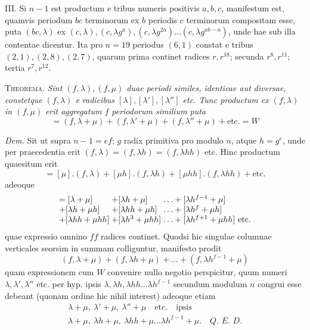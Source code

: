 III. Si \(n-1\) est productum e tribus numeris positivis \(a,\allowbreak b,\allowbreak c\), manifestum est, quamvis periodum \(bc\) terminorum ex \(b\) periodis \(c\) terminorum compositam esse, puta \((bc,\allowbreak \lambda)\) ex \((c,\allowbreak \lambda),\allowbreak (c,\allowbreak \lambda g^a),\allowbreak (c,\allowbreak \lambda g^{2a})\ldots(c,\allowbreak \lambda g^{ab-a})\), unde hae sub illa contentae dicentur. Ita pro \(n=19\) periodus \((6,\allowbreak 1)\) constat e tribus \((2,\allowbreak 1),\allowbreak (2,\allowbreak 8),\allowbreak (2,\allowbreak 7)\), quarum prima continet radices \(r,\allowbreak r^{18}\); secunda \(r^8,\allowbreak r^{11}\); tertia \(r^7,\allowbreak r^{12}\).

\textsc{Theorema.} \textit{Sint \((f,\allowbreak \lambda),\allowbreak (f,\allowbreak \mu)\) duae periodi similes, identicae aut diversae,} \textit{constetque \((f,\allowbreak \lambda)\) e radicibus \([\lambda],\allowbreak [\lambda'],\allowbreak [\lambda'']\) etc. Tunc productum ex \((f,\allowbreak \lambda)\) in \((f,\allowbreak \mu)\)} \textit{erit aggregatum \(f\) periodorum similium puta} \[=(f,\lambda+\mu)+(f,\lambda'+\mu)+(f,\lambda''+\mu)+\mathrm{etc.}=W\]

\textit{Dem.} Sit ut supra \(n-1=ef\); \(g\) radix primitiva pro modulo \(n\), atque \(h=g^e\), unde per praecedentia erit \((f,\allowbreak \lambda)=(f,\allowbreak \lambda h)=(f,\allowbreak \lambda hh)\) etc. Hinc productum quaesitum erit \[=[\mu].(f,\lambda)+[\mu h].(f,\lambda h)+[\mu hh].(f,\lambda hh)+\mathrm{etc.}\] adeoque \[\begin{array}{@{}l@{\;}l@{\;}l@{}}
=[\lambda+\mu]&+[\lambda h+\mu]&\ldots+[\lambda h^{f-1}+\mu]\\
+[\lambda h+\mu h]&+[\lambda hh+\mu h]&\ldots+[\lambda h^f+\mu h]\\
+[\lambda hh+\mu hh]&+[\lambda h^3+\mu hh]&\ldots+[\lambda h^{f+1}+\mu hh]\ \mathrm{etc.}
\end{array}\] quae expressio omnino \(ff\) radices continet. Quodsi hic singulae columnae verticales seorsim in summam colliguntur, manifesto prodit \[(f,\lambda+\mu)+(f,\lambda h+\mu)+\ldots+(f,\lambda h^{f-1}+\mu)\] quam expressionem cum \(W\) convenire nullo negotio perspicitur, quum numeri \(\lambda,\allowbreak \lambda',\allowbreak \lambda''\) etc. per hyp. ipsis \(\lambda,\allowbreak \lambda h,\allowbreak \lambda hh\ldots\lambda h^{f-1}\) secundum modulum \(n\) congrui esse debeant (quonam ordine hic nihil interest) adeoque etiam \[\begin{gathered}
\lambda+\mu,\ \lambda'+\mu,\ \lambda''+\mu\quad\mathrm{etc.}\quad\text{ipsis}\\
\lambda+\mu,\ \lambda h+\mu,\ \lambda hh+\mu\ldots\lambda h^{f-1}+\mu.\quad\textit{Q. E. D.}
\end{gathered}\]

